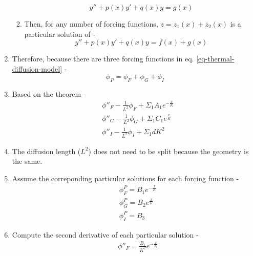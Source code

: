 \documentclass[11pt,a4paper]{article}
\begin{document}
\begin{enumerate}[leftmargin=*,topsep=0pt]
\begin{enumerate}[leftmargin=*,topsep=0pt]
\begin{equation*}
                    y''+p(x)y'+q(x)y=g(x)
                \end{equation*}
            \item Then, for any number of forcing functions, $z=z_1(x)+z_2(x)$ is a particular solution of -
                \begin{equation*}
                    y''+p(x)y'+q(x)y=f(x)+g(x)
                \end{equation*}
        \end{enumerate}
    \item Therefore, because there are three forcing functions in eq. \ref{eq-thermal-diffusion-model} - 
        \begin{equation}
            \phi_P=\phi_F+\phi_G+\phi_I
        \end{equation}
    \item Based on the theorem - 
        \begin{equation} \label{eq-thermal-particular}
            \begin{split}
                & \phi''_F-\frac{1}{L^2}\phi_F+\Sigma_1 A_1 e^{-\frac{x}{K}} \\
                & \phi''_G-\frac{1}{L^2}\phi_G+\Sigma_1 C_1 e^{\frac{x}{K}} \\
                & \phi''_I-\frac{1}{L^2}\phi_I+\Sigma_1 dK^2
            \end{split}
        \end{equation}
    \item[] The diffusion length ($L^2$) does not need to be split because the geometry is the same.
    \item Assume the correponding particular solutions for each forcing function - 
        \begin{equation} \label{eq-thermal-assumed-particular}
            \begin{split}
                & \phi_F^P=B_1e^{-\frac{x}{K}} \\
                & \phi_G^P=B_2e^{\frac{x}{K}} \\
                & \phi_I^P=B_3
            \end{split}
        \end{equation}
    \item Compute the second derivative of each particular solution - 
        \begin{equation}
            \begin{split} \label{eq-thermal-assumed-particular-derivative}
                & \phi''_F=\frac{B_1}{K^2}e^{-\frac{x}{K}} \\

\end{split}
\end{equation}
\end{enumerate}
\end{document}

